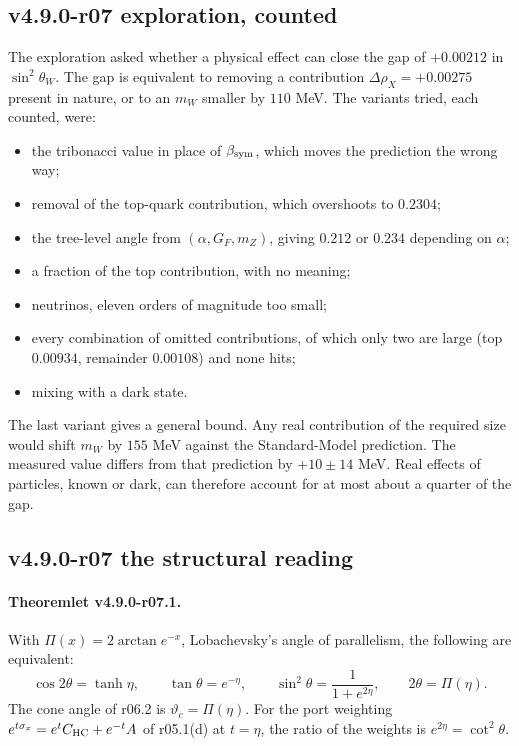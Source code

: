 \subsection*{v4.9.0-r07 exploration, counted}
\label{subsec:v490-r07-exploration}

The exploration asked whether a physical effect can close the gap of \(+0.00212\) in \(\sin^2\theta_W\).  The gap is
equivalent to removing a contribution \(\Delta\rho_X=+0.00275\) present in nature, or to an \(m_W\) smaller by
\(110\) MeV.  The variants tried, each counted, were:
\begin{itemize}[leftmargin=2em]
\item the tribonacci value in place of \(\beta_{\mathrm{sym}}\), which moves the prediction the wrong way;
\item removal of the top-quark contribution, which overshoots to \(0.2304\);
\item the tree-level angle from \((\alpha,G_F,m_Z)\), giving \(0.212\) or \(0.234\) depending on \(\alpha\);
\item a fraction of the top contribution, with no meaning;
\item neutrinos, eleven orders of magnitude too small;
\item every combination of omitted contributions, of which only two are large (top \(0.00934\), remainder \(0.00108\))
and none hits;
\item mixing with a dark state.
\end{itemize}
The last variant gives a general bound.  Any real contribution of the required size would shift \(m_W\) by \(155\) MeV
against the Standard-Model prediction.  The measured value differs from that prediction by \(+10\pm14\) MeV.  Real effects
of particles, known or dark, can therefore account for at most about a quarter of the gap.

\subsection*{v4.9.0-r07 the structural reading}
\label{subsec:v490-r07-structure}

\paragraph{Theoremlet v4.9.0-r07.1.}
With \(\Pi(x)=2\arctan e^{-x}\), Lobachevsky's angle of parallelism, the following are equivalent:
\[
\cos2\theta=\tanh\eta,\qquad \tan\theta=e^{-\eta},\qquad \sin^2\theta=\frac1{1+e^{2\eta}},\qquad 2\theta=\Pi(\eta).
\]
The cone angle of r06.2 is \(\vartheta_c=\Pi(\eta)\).  For the port weighting \(e^{t\sigma_x}=e^tC_{\mathrm{HC}}+e^{-t}A\) of
r05.1(d) at \(t=\eta\), the ratio of the weights is \(e^{2\eta}=\cot^2\theta\).

